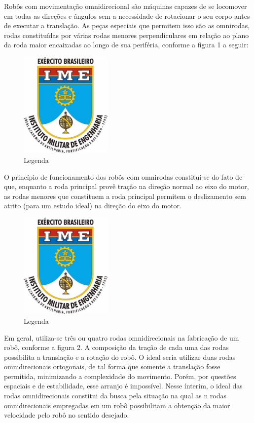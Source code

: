 \documentclass{article}
\begin{document}
Robôs com movimentação omnidirecional são máquinas capazes de se locomover em todas as direções e ângulos sem a necessidade de rotacionar o seu corpo antes de executar a translação. As peças especiais que permitem isso são as omnirodas, rodas constituídas por várias rodas menores perpendiculares em relação ao plano da roda maior encaixadas ao longo de sua periféria, conforme a figura 1 a seguir:

\begin{figure}[H]
\centering
\includegraphics[width=0.4\textwidth]{ime.jpg}
\caption{Legenda}
\label{Rotulo}
\end{figure}

O princípio de funcionamento dos robôs com omnirodas constitui-se do fato de que, enquanto a roda principal provê tração na direção normal ao eixo do motor, as rodas menores que constituem a roda principal permitem o deslizamento sem atrito (para um estudo ideal) na direção do eixo do motor.

\begin{figure}[H]
\centering
\includegraphics[width=0.4\textwidth]{ime.jpg}
\caption{Legenda}
\label{Rotulo}
\end{figure}


Em geral, utiliza-se três ou quatro rodas omnidirecionais na fabricação de um robô, conforme a figura 2. A composição da tração de cada uma das rodas possibilita a translação e a rotação do robô. O ideal seria utilizar duas rodas omnidirecionais ortogonais, de tal forma que somente a translação fosse permitida, minimizando a complexidade do movimento. Porém, por questões espaciais e de estabilidade, esse arranjo é impossível. 
Nesse ínterim, o ideal das rodas omnidirecionais constitui da busca pela situação na qual as n rodas omnidirecionais empregadas em um robô possibilitam a obtenção da maior velocidade pelo robô no sentido desejado.
\end{document}
